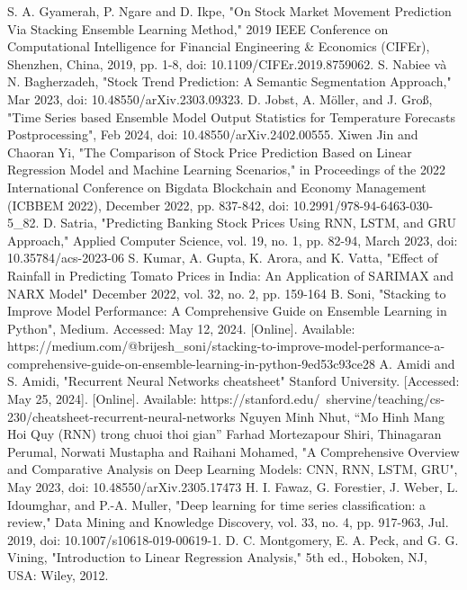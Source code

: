 \documentclass{ieeeojies}
\begin{document}
\begin{thebibliography}{00}
 S. A. Gyamerah, P. Ngare and D. Ikpe, "On Stock Market Movement Prediction Via Stacking Ensemble Learning Method," 2019 IEEE Conference on Computational Intelligence for Financial Engineering \& Economics (CIFEr), Shenzhen, China, 2019, pp. 1-8, doi: 10.1109/CIFEr.2019.8759062.
 S. Nabiee và N. Bagherzadeh, "Stock Trend Prediction: A Semantic Segmentation Approach,"  Mar 2023, doi: 10.48550/arXiv.2303.09323.
 D. Jobst, A. Möller, and J. Groß, "Time Series based Ensemble Model Output Statistics for Temperature Forecasts Postprocessing", Feb 2024, doi: 10.48550/arXiv.2402.00555.
 Xiwen Jin and Chaoran Yi, "The Comparison of Stock Price Prediction Based on Linear Regression Model and Machine Learning Scenarios," in Proceedings of the 2022 International Conference on Bigdata Blockchain and Economy Management (ICBBEM 2022), December 2022, pp. 837-842, doi: 10.2991/978-94-6463-030-5\_82.
 D. Satria, "Predicting Banking Stock Prices Using RNN, LSTM, and GRU Approach," Applied Computer Science, vol. 19, no. 1, pp. 82-94, March 2023, doi: 10.35784/acs-2023-06
 S. Kumar, A. Gupta, K. Arora, and K. Vatta, "Effect of Rainfall in Predicting Tomato Prices in India: An Application of SARIMAX and NARX Model" December 2022, vol. 32, no. 2, pp. 159-164
 B. Soni, "Stacking to Improve Model Performance: A Comprehensive Guide on Ensemble Learning in Python", Medium. Accessed: May 12, 2024. [Online]. Available: https://medium.com/@brijesh\_soni/stacking-to-improve-model-performance-a-comprehensive-guide-on-ensemble-learning-in-python-9ed53c93ce28
 A. Amidi and S. Amidi, "Recurrent Neural Networks cheatsheet" Stanford University. [Accessed: May 25, 2024]. [Online]. Available: https://stanford.edu/~shervine/teaching/cs-230/cheatsheet-recurrent-neural-networks
 Nguyen Minh Nhut, “Mo Hinh Mang Hoi Quy (RNN) trong chuoi thoi gian”
 Farhad Mortezapour Shiri, Thinagaran Perumal, Norwati Mustapha and Raihani Mohamed, "A Comprehensive Overview and Comparative Analysis on Deep Learning Models: CNN, RNN, LSTM, GRU", May 2023, doi: 10.48550/arXiv.2305.17473
 H. I. Fawaz, G. Forestier, J. Weber, L. Idoumghar, and P.-A. Muller, "Deep learning for time series classification: a review," Data Mining and Knowledge Discovery, vol. 33, no. 4, pp. 917-963, Jul. 2019, doi: 10.1007/s10618-019-00619-1.
 D. C. Montgomery, E. A. Peck, and G. G. Vining, "Introduction to Linear Regression Analysis," 5th ed., Hoboken, NJ, USA: Wiley, 2012.

\end{thebibliography}


\EOD
\end{document}
